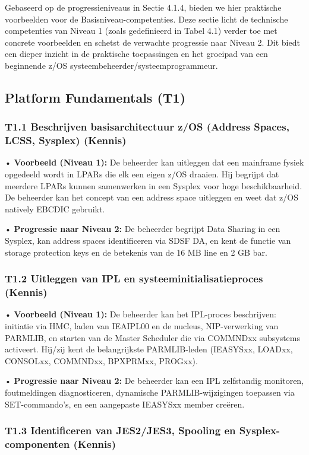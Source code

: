 Gebaseerd op de progressieniveaus in Sectie 4.1.4, bieden we hier praktische voorbeelden voor de Basisniveau-competenties. Deze sectie licht de technische competenties van Niveau 1 (zoals gedefinieerd in Tabel 4.1) verder toe met concrete voorbeelden en schetst de verwachte progressie naar Niveau 2. Dit biedt een dieper inzicht in de praktische toepassingen en het groeipad van een beginnende z/OS systeembeheerder/systeemprogrammeur.

\subsection{Platform Fundamentals (T1)}

\subsubsection{T1.1 Beschrijven basisarchitectuur z/OS (Address Spaces, LCSS, Sysplex) (Kennis)}

• \textbf{Voorbeeld (Niveau 1):} De beheerder kan uitleggen dat een mainframe fysiek opgedeeld wordt in LPARs die elk een eigen z/OS draaien. Hij begrijpt dat meerdere LPARs kunnen samenwerken in een Sysplex voor hoge beschikbaarheid. De beheerder kan het concept van een address space uitleggen en weet dat z/OS natively EBCDIC gebruikt.

• \textbf{Progressie naar Niveau 2:} De beheerder begrijpt Data Sharing in een Sysplex, kan address spaces identificeren via SDSF DA, en kent de functie van storage protection keys en de betekenis van de 16 MB line en 2 GB bar.

\subsubsection{T1.2 Uitleggen van IPL en systeeminitialisatieproces (Kennis)}

• \textbf{Voorbeeld (Niveau 1):} De beheerder kan het IPL-proces beschrijven: initiatie via HMC, laden van IEAIPL00 en de nucleus, NIP-verwerking van PARMLIB, en starten van de Master Scheduler die via COMMNDxx subsystems activeert. Hij/zij kent de belangrijkste PARMLIB-leden (IEASYSxx, LOADxx, CONSOLxx, COMMNDxx, BPXPRMxx, PROGxx).

• \textbf{Progressie naar Niveau 2:} De beheerder kan een IPL zelfstandig monitoren, foutmeldingen diagnosticeren, dynamische PARMLIB-wijzigingen toepassen via SET-commando's, en een aangepaste IEASYSxx member creëren.

\subsubsection{T1.3 Identificeren van JES2/JES3, Spooling en Sysplex-componenten (Kennis)}

